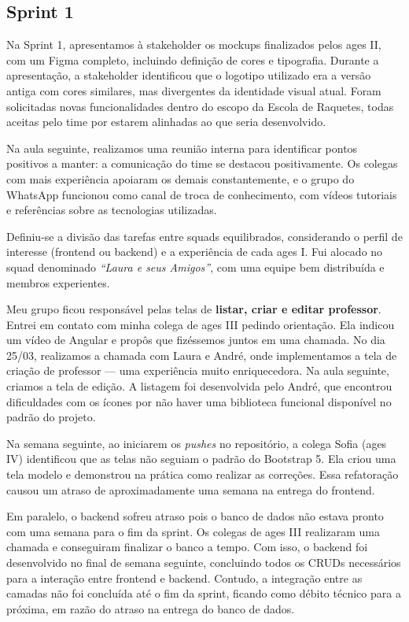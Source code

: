 \subsection{Sprint 1}

Na Sprint 1, apresentamos à stakeholder os mockups finalizados pelos \ac{ages} II, com um
Figma completo, incluindo definição de cores e tipografia. Durante a apresentação, a
stakeholder identificou que o logotipo utilizado era a versão antiga com cores similares,
mas divergentes da identidade visual atual. Foram solicitadas novas funcionalidades dentro
do escopo da Escola de Raquetes, todas aceitas pelo time por estarem alinhadas ao que
seria desenvolvido.

Na aula seguinte, realizamos uma reunião interna para identificar pontos positivos a manter:
a comunicação do time se destacou positivamente. Os colegas com mais experiência apoiaram
os demais constantemente, e o grupo do WhatsApp funcionou como canal de troca de
conhecimento, com vídeos tutoriais e referências sobre as tecnologias utilizadas.

Definiu-se a divisão das tarefas entre squads equilibrados, considerando o perfil de
interesse (frontend ou backend) e a experiência de cada \ac{ages} I. Fui alocado no squad
denominado \textit{``Laura e seus Amigos''}, com uma equipe bem distribuída e membros
experientes.

Meu grupo ficou responsável pelas telas de \textbf{listar, criar e editar professor}.
Entrei em contato com minha colega de \ac{ages} III pedindo orientação. Ela indicou um vídeo
de Angular e propôs que fizéssemos juntos em uma chamada. No dia 25/03, realizamos a
chamada com Laura e André, onde implementamos a tela de criação de professor --- uma
experiência muito enriquecedora. Na aula seguinte, criamos a tela de edição. A listagem
foi desenvolvida pelo André, que encontrou dificuldades com os ícones por não haver uma
biblioteca funcional disponível no padrão do projeto.

Na semana seguinte, ao iniciarem os \textit{pushes} no repositório, a colega Sofia (\ac{ages} IV)
identificou que as telas não seguiam o padrão do Bootstrap 5. Ela criou uma tela modelo
e demonstrou na prática como realizar as correções. Essa refatoração causou um atraso de
aproximadamente uma semana na entrega do frontend.

Em paralelo, o backend sofreu atraso pois o banco de dados não estava pronto com uma semana
para o fim da sprint. Os colegas de \ac{ages} III realizaram uma chamada e conseguiram finalizar
o banco a tempo. Com isso, o backend foi desenvolvido no final de semana seguinte, concluindo
todos os CRUDs necessários para a interação entre frontend e backend. Contudo, a integração
entre as camadas não foi concluída até o fim da sprint, ficando como débito técnico para a
próxima, em razão do atraso na entrega do banco de dados.
